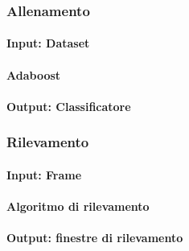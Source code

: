             \subsubsection{Allenamento}
                \paragraph{Input: Dataset}
                \paragraph{Adaboost}
                \paragraph{Output: Classificatore}
            \subsubsection{Rilevamento}
                \paragraph{Input: Frame}
                \paragraph{Algoritmo di rilevamento}
                \paragraph{Output: finestre di rilevamento}
